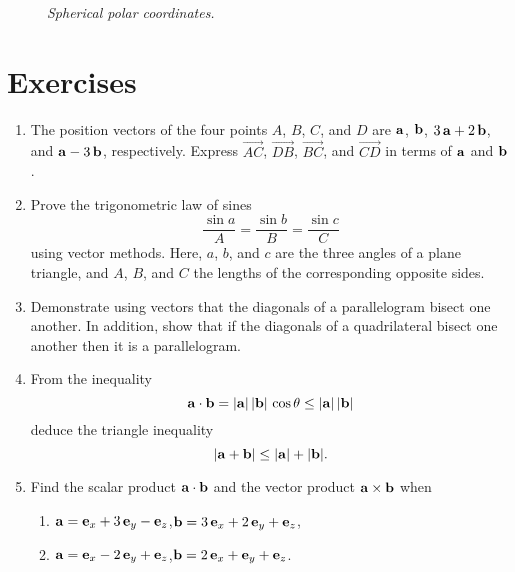 \begin{figure}
\epsfysize=2.75in
\centerline{}
\caption{\em Spherical polar coordinates.}\label{fsphx}
\end{figure}

\section{Exercises}
{\small 
\renewcommand{\theenumi}{A.\arabic{enumi}}
\begin{enumerate}
\item The position vectors of the four  points $A$, $B$, $C$, and $D$ are ${\bf a}$, ${\bf b}$, $3\,{\bf a}+2\,{\bf b}$,
and ${\bf a}-3\,{\bf b}$, respectively. Express $\stackrel{\displaystyle \rightarrow}{AC}$, $\stackrel{\displaystyle \rightarrow}{DB}$,
$\stackrel{\displaystyle \rightarrow}{BC}$, and $\stackrel{\displaystyle \rightarrow}{CD}$ in terms of ${\bf a}$ and ${\bf b}$. 
\item Prove the trigonometric law of sines 
$$
\frac{\sin a}{A} = \frac{\sin b}{B} = \frac{\sin c}{C}
$$
using vector methods. Here, $a$, $b$, and $c$ are  the three
angles of a plane triangle, and $A$, $B$, and $C$ the lengths of the corresponding opposite sides.

\item Demonstrate using vectors that the diagonals of a parallelogram bisect one another. In addition, show  that if the diagonals of a quadrilateral bisect one another then it is a parallelogram.

\item From the inequality
$$
{\bf a}\cdot{\bf b}= |{\bf a}|\,|{\bf b}|\,\cos\theta\leq |{\bf a}|\,|{\bf b}|
$$
deduce the triangle inequality
$$
|{\bf a} + {\bf b}|\leq |{\bf a}|+|{\bf b}|.
$$

\item Find the scalar product ${\bf a}\cdot{\bf b}$ and the vector product ${\bf a}\times {\bf b}$ when
\begin{enumerate}
\item ${\bf a} = {\bf e}_x + 3\,{\bf e}_y-{\bf e}_z$,\mbox{\hspace{0.5cm}}${\bf b} = 3\,{\bf e}_x+ 2\,{\bf e}_y+{\bf e}_z$,
\item ${\bf a} = {\bf e}_x - 2\,{\bf e}_y+{\bf e}_z$,\mbox{\hspace{0.5cm}}${\bf b} = 2\,{\bf e}_x+ {\bf e}_y+{\bf e}_z$.
\end{enumerate}


\end{enumerate}}
